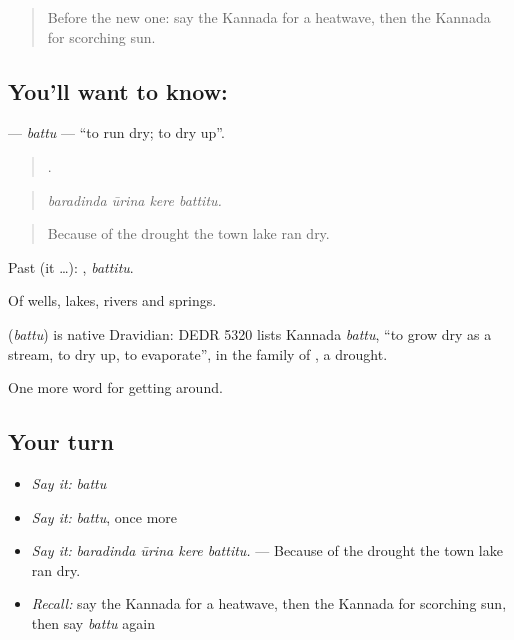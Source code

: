 \label{lesson:KA-C488-battu}



\begin{quote}
Before the new one: say the Kannada for a heatwave, then the Kannada for scorching sun.
\end{quote}

\subsection*{You'll want to know: }
\textbf{} — \emph{battu} — \textquotedblleft{}to run dry; to dry up\textquotedblright{}.

\begin{quote}
   .
\end{quote}

\begin{quote}
\emph{baradinda ūrina kere battitu.}
\end{quote}

\begin{quote}
Because of the drought the town lake ran dry.
\end{quote}

Past (it …): , \emph{battitu}.

Of wells, lakes, rivers and springs.

\begin{cousinweb}
\textbf{} (\emph{battu}) is native Dravidian: DEDR 5320 lists Kannada \emph{battu}, \textquotedblleft{}to grow dry as a stream, to dry up, to evaporate\textquotedblright{}, in the family of , a drought.
\end{cousinweb}

\begin{grammarlens}[title={What you've built}]
One more word for getting around.
\end{grammarlens}

\subsection*{Your turn}
\begin{itemize}
\raggedright
  \item \emph{Say it:} \emph{battu}
  \item \emph{Say it:} \emph{battu}, once more
  \item \emph{Say it:} \emph{baradinda ūrina kere battitu.} — Because of the drought the town lake ran dry.
  \item \emph{Recall:} say the Kannada for a heatwave, then the Kannada for scorching sun, then say \emph{battu} again
\end{itemize}

